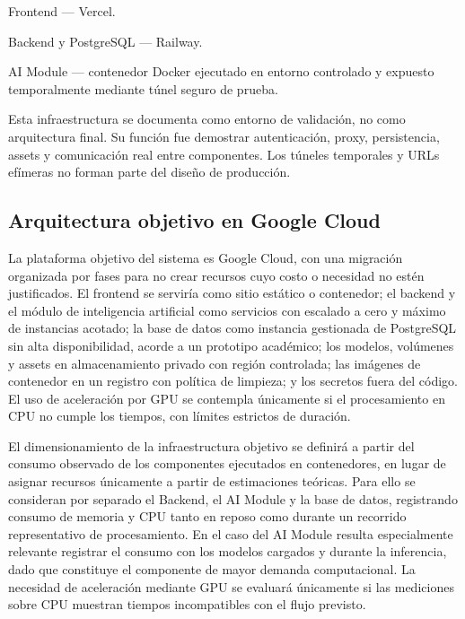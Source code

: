 Frontend — Vercel.

Backend y PostgreSQL — Railway.

AI Module — contenedor Docker ejecutado en entorno controlado y expuesto temporalmente mediante túnel seguro de prueba.

Esta infraestructura se documenta como entorno de validación, no como arquitectura final. Su función fue demostrar autenticación, proxy, persistencia, assets y comunicación real entre componentes. Los túneles temporales y URLs efímeras no forman parte del diseño de producción.

\subsection{Arquitectura objetivo en Google Cloud}

La plataforma objetivo del sistema es Google Cloud, con una migración organizada por fases para no crear recursos cuyo costo o necesidad no estén justificados. El frontend se serviría como sitio estático o contenedor; el backend y el módulo de inteligencia artificial como servicios con escalado a cero y máximo de instancias acotado; la base de datos como instancia gestionada de PostgreSQL sin alta disponibilidad, acorde a un prototipo académico; los modelos, volúmenes y assets en almacenamiento privado con región controlada; las imágenes de contenedor en un registro con política de limpieza; y los secretos fuera del código. El uso de aceleración por GPU se contempla únicamente si el procesamiento en CPU no cumple los tiempos, con límites estrictos de duración.

El dimensionamiento de la infraestructura objetivo se definirá a partir del consumo observado de los componentes ejecutados en contenedores, en lugar de asignar recursos únicamente a partir de estimaciones teóricas. Para ello se consideran por separado el Backend, el AI Module y la base de datos, registrando consumo de memoria y CPU tanto en reposo como durante un recorrido representativo de procesamiento. En el caso del AI Module resulta especialmente relevante registrar el consumo con los modelos cargados y durante la inferencia, dado que constituye el componente de mayor demanda computacional. La necesidad de aceleración mediante GPU se evaluará únicamente si las mediciones sobre CPU muestran tiempos incompatibles con el flujo previsto.

